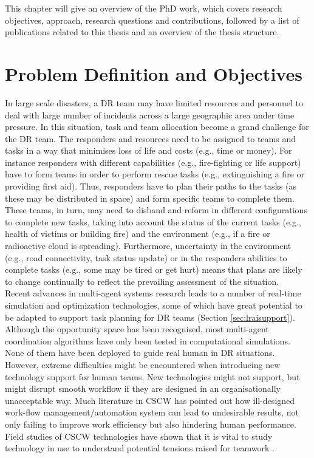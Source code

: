 This chapter will give an overview of the PhD work, which covers research objectives, approach, research questions and contributions, followed by a list of publications related to this thesis and an overview of the thesis structure.\\


\section{Problem Definition and Objectives}
In large scale disasters, a \ac{DR} team may have limited resources and personnel to deal with large number of incidents across a large geographic area under time pressure. In this situation, task and team allocation become a grand challenge for the \ac{DR} team. The responders and resources need to be assigned to teams and tasks in a way that minimises loss of life and costs (e.g., time or money). For instance responders with different capabilities (e.g., fire-fighting or life support) have to form teams in order to perform rescue tasks (e.g., extinguishing a fire or providing first aid). Thus, responders have to plan their paths to the tasks (as these may be distributed in space) and form specific teams to complete them. These teams, in turn, may need to disband and reform in different configurations to complete new tasks, taking into account the status of the current tasks (e.g., health of victims or building fire) and the environment (e.g., if a fire or radioactive cloud is spreading). Furthermore, uncertainty in the environment (e.g., road connectivity, task status update) or in the responders abilities to complete tasks (e.g., some may be tired or get hurt) means that plans are likely to change continually to reflect the prevailing assessment of the situation.\\

Recent advances in multi-agent systems research leads to a number of real-time simulation and optimization technologies, some of which have great potential to be adapted to support task planning for \ac{DR} teams (Section \ref{sec:lraisupport}). Although the opportunity space has been recognised, most multi-agent coordination algorithms have only been tested in computational simulations. None of them have been deployed to guide real human in \ac{DR} situations. However, extreme difficulties might be encountered when introducing new technology support for human teams. New technologies might not support, but might disrupt smooth workflow if they are designed in an organisationally unacceptable way. Much literature in \ac{CSCW} has pointed out how ill-designed work-flow management/automation system can lead to undesirable results, not only failing to improve work efficiency but also hindering human performance. Field studies of \ac{CSCW} technologies have shown that it is vital to study technology in use to understand potential tensions raised for teamwork \citep{Bowers1994}.\\


